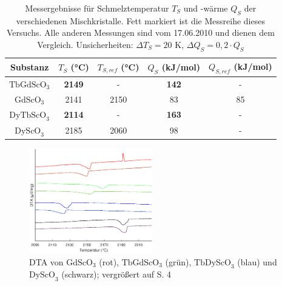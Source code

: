 \documentclass[aps,twocolumn,secnumarabic,nobalancelastpage,amsmath,amssymb,
nofootinbib,superscriptaddress]{revtex4-1}
\begin{document}
\begin{table}[h]
\begin{ruledtabular}
\begin{tabular}{ccccc}
 Substanz & $T_S$ (°C) & $T_{S,ref}$ (°C) & $Q_S$ (kJ/mol) & $Q_{S,ref}$ (kJ/mol)\\
\hline
  \textbf{$\text{TbGdScO}_3$}  & \textbf{2149} & -    & \textbf{142} & -  \\
  $\text{GdScO}_3$    & 2141 & 2150 \cite{paperK} & 83  & 85 \\
  \textbf{$\text{DyTbScO}_3$}  & \textbf{2114} & -    & \textbf{163} & -  \\
  $\text{DyScO}_3$    & 2185 & 2060 \cite{meltpDyScO3} & 98  & - \\
\end{tabular}
\end{ruledtabular}
\caption{\label{tab:erg} Messergebnisse für Schmelztemperatur $T_S$ und -wärme $Q_S$ der verschiedenen Mischkristalle. Fett markiert ist die Messreihe dieses Versuchs.
Alle anderen Messungen sind vom 17.06.2010 und dienen dem Vergleich. Unsicherheiten: $\Delta T_S=20\text{ K}$, $\Delta Q_S=0,2\cdot Q_S$ }
\end{table}

\begin{figure}[h]
  \centering
   \includegraphics[width=0.48\textwidth]{../img/vglSkandate.eps}
  \caption{\label{fig:dtaAll} DTA von $\text{GdScO}_3$ (rot), $\text{TbGdScO}_3$ (grün), $\text{TbDyScO}_3$ (blau) und $\text{DyScO}_3$ (schwarz); vergrößert auf S. 4}
\end{figure}
\end{document}
